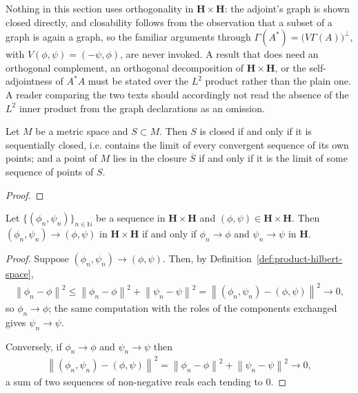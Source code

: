 \begin{definition}
    Nothing in this section uses orthogonality in $\mathbf{H}\times\mathbf{H}$: the adjoint's graph is shown closed directly, and closability follows from the observation that a subset of a graph is again a graph, so the familiar arguments through $\Gamma(A^*) = \big( V\Gamma(A) \big)^\perp$, with $V(\phi,\psi) = (-\psi,\phi)$, are never invoked. A result that does need an orthogonal complement, an orthogonal decomposition of $\mathbf{H}\times\mathbf{H}$, or the self-adjointness of $A^*A$ must be stated over the $L^2$ product rather than the plain one. A reader comparing the two texts should accordingly not read the absence of the $L^2$ inner product from the graph declarations as an omission.
\end{definition}

\begin{theorem}
    \label{thrm:sequential-closedness}
    \leanok
    Let $M$ be a metric space and $S \subset M$. Then $S$ is closed if and only if it is sequentially closed, i.e. contains the limit of every convergent sequence of its own points; and a point of $M$ lies in the closure $\overline{S}$ if and only if it is the limit of some sequence of points of $S$.
\end{theorem}
\begin{proof}
\leanok
\end{proof}

\begin{lemma}
    \label{lmm:componentwise-convergence}
    \leanok
    Let $\{(\phi_n,\psi_n)\}_{n\in\mathbb{N}}$ be a sequence in $\mathbf{H}\times\mathbf{H}$ and $(\phi,\psi) \in \mathbf{H}\times\mathbf{H}$. Then $(\phi_n,\psi_n) \to (\phi,\psi)$ in $\mathbf{H}\times\mathbf{H}$ if and only if $\phi_n \to \phi$ and $\psi_n \to \psi$ in $\mathbf{H}$.
\end{lemma}
\begin{proof}
    \leanok
Suppose $(\phi_n,\psi_n) \to (\phi,\psi)$. Then, by Definition~\ref{def:product-hilbert-space},
\begin{align}
    \left\| \phi_n - \phi \right\|^2 \le \left\| \phi_n-\phi \right\|^2 + \left\| \psi_n-\psi \right\|^2 = \left\| (\phi_n,\psi_n)-(\phi,\psi) \right\|^2 \longrightarrow 0,
\end{align}
so $\phi_n \to \phi$; the same computation with the roles of the components exchanged gives $\psi_n \to \psi$.

Conversely, if $\phi_n \to \phi$ and $\psi_n \to \psi$ then
\begin{align}
    \left\| (\phi_n,\psi_n)-(\phi,\psi) \right\|^2 = \left\| \phi_n-\phi \right\|^2 + \left\| \psi_n-\psi \right\|^2 \longrightarrow 0,
\end{align}
a sum of two sequences of non-negative reals each tending to $0$.
\end{proof}

